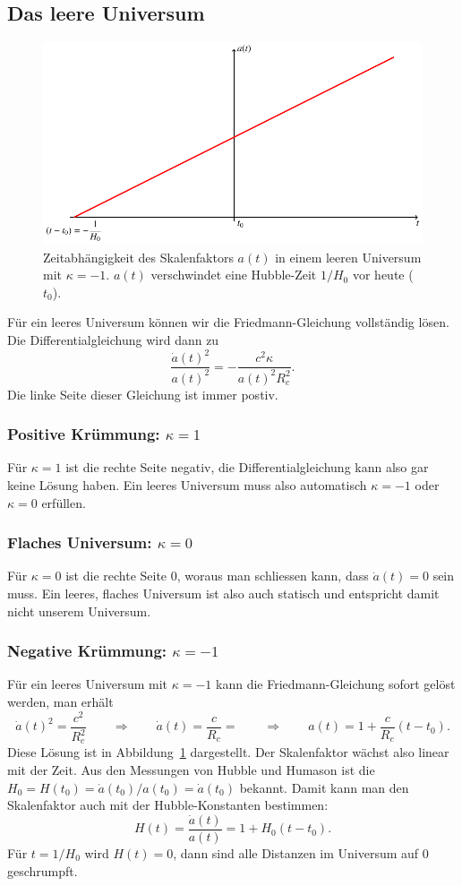 \subsection{Das leere Universum}
\begin{figure}
\centering
\includegraphics{chapters/tikz/friedmann-leer.pdf}
\caption{Zeitabhängigkeit des Skalenfaktors $a(t)$ in einem leeren
Universum mit $\kappa = -1$.
$a(t)$ verschwindet eine Hubble-Zeit $1/H_0$ vor heute ($t_0$).
\label{chapter:friedmann:graph:leer}}
\end{figure}
Für ein leeres Universum können wir die Friedmann-Gleichung vollständig
lösen.
Die Differentialgleichung wird dann zu
\[
\frac{\dot a(t)^2}{a(t)^2}
=
-\frac{c^2\kappa}{a(t)^2R_c^2}.
\]
Die linke Seite dieser Gleichung ist immer postiv.

\subsubsection{Positive Krümmung: $\kappa=1$}
Für $\kappa=1$ ist die rechte Seite negativ, die Differentialgleichung
kann also gar keine Lösung haben.
Ein leeres Universum muss also automatisch $\kappa=-1$ oder $\kappa=0$
erfüllen.

\subsubsection{Flaches Universum: $\kappa=0$}
Für $\kappa=0$ ist die rechte Seite $0$, woraus man schliessen kann,
dass $\dot a(t)=0$ sein muss.
Ein leeres, flaches Universum ist also auch statisch und entspricht
damit nicht unserem Universum.

\subsubsection{Negative Krümmung: $\kappa=-1$}
Für ein leeres Universum mit $\kappa=-1$ kann die Friedmann-Gleichung sofort
gelöst werden, man erhält
\[
\dot a(t)^2
=
\frac{c^2}{R_c^2}
\qquad\Rightarrow\qquad
\dot a(t) = \frac{c}{R_c} = 
\qquad\Rightarrow\qquad
a(t)= 1 + \frac{c}{R_c}(t-t_0).
\]
Diese Lösung ist in Abbildung~\ref{chapter:friedmann:graph:leer} dargestellt.
Der Skalenfaktor wächst also linear mit der Zeit.
Aus den Messungen von Hubble und Humason ist die
$H_0=H(t_0)=\dot a(t_0)/a(t_0)=\dot a(t_0)$
bekannt.
Damit kann man den Skalenfaktor auch mit der Hubble-Konstanten
bestimmen:
\[
H(t) =  \frac{\dot a(t)}{a(t)} = 1 + H_0(t-t_0).
\]
Für $t=1/H_0$ wird $H(t)=0$, dann sind alle Distanzen im
Universum auf $0$ geschrumpft.


